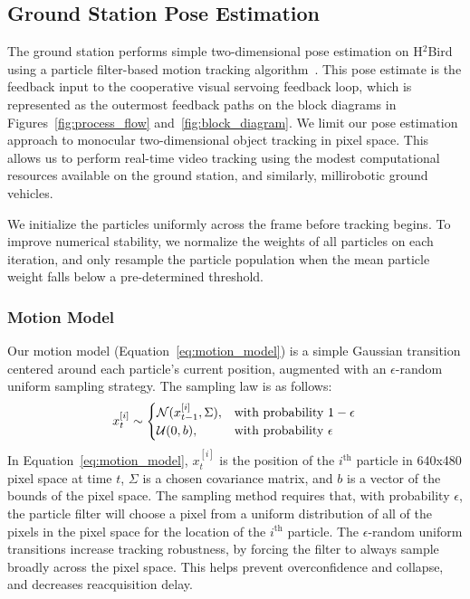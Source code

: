 \documentclass{aamas2013}
\begin{document}
\subsection{Ground Station Pose Estimation}
The ground station performs simple two-dimensional pose estimation on 
H$^2$Bird using a particle filter-based motion tracking algorithm~\cite{thrun2005probabilistic}. This pose 
estimate is the feedback input to the cooperative visual servoing feedback 
loop, which is represented as the outermost feedback paths on the block 
diagrams in Figures~\ref{fig:process_flow} and~\ref{fig:block_diagram}. We 
limit our pose estimation approach to monocular two-dimensional object 
tracking in pixel space. This allows us to perform real-time video tracking 
using the modest computational resources available on the ground station, 
and similarly, millirobotic ground vehicles.

We initialize the particles 
uniformly across the frame before tracking begins. To improve numerical 
stability, we normalize the weights of all particles on each iteration, and 
only resample the particle population when the mean particle weight falls 
below a pre-determined threshold. 
\subsubsection{Motion Model}
Our motion model (Equation~\ref{eq:motion_model}) is a simple Gaussian transition 
centered around each particle's current position, augmented with an 
$\epsilon$-random uniform sampling strategy. The sampling law is as follows:\begin{equation}
\label{eq:motion_model}
x^{[i]}_t \sim \begin{cases}
\mathcal{N}(x^{[i]}_{t-1}, \Sigma), &\text{with probability } 1-\epsilon \\
\mathcal{U}(0,b),& \text{with probability } \epsilon \\
\end{cases}\\
\end{equation}
In Equation~\ref{eq:motion_model}, $x^{[i]}_t$ is the position of the $i^\text{th}$ 
particle in 640x480 pixel space at time $t$, $\Sigma$ is a chosen covariance matrix, and $b$ 
is a vector of the bounds of the pixel space. The sampling method requires that, with 
probability $\epsilon$, the particle filter will choose a pixel from a uniform 
distribution of all of the pixels in the pixel space for the location of the $i^\text{th}$ 
particle. The $\epsilon$-random uniform transitions increase tracking robustness, by 
forcing the filter to always sample broadly across the pixel space. This helps prevent 
overconfidence and collapse, and decreases reacquisition delay. 
\end{document}
